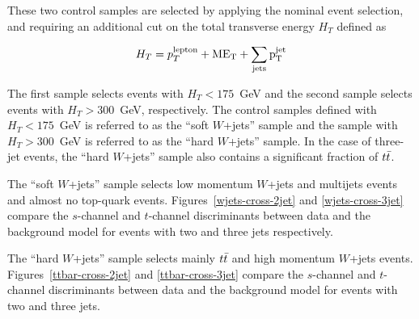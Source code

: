 These two control samples are selected by applying the nominal event
selection, and requiring an additional cut on the total transverse energy $H_{T}$ defined as

\begin{equation}
H_{T} = p^{\rm{lepton}}_{T} + \rm{M}E_{T} + \sum_{\rm{jets}} p^{jet}_{T}
\end{equation}

The first sample selects events with $H_T<175$~GeV and the second sample selects events with $H_T>300$~GeV,
respectively. The control samples defined with $H_{T}<175$~GeV is referred to as the ``soft $W$+jets'' sample and the sample with $H_{T}>300$~GeV is referred to as the ``hard $W$+jets'' sample. In the case of three-jet events, the ``hard $W$+jets'' sample also contains a
significant fraction of $\mbox{$t\bar{t}$}$.

The ``soft $W$+jets'' sample selects low momentum $W$+jets and
multijets events and almost no top-quark events.
Figures~\ref{wjets-cross-2jet} and \ref{wjets-cross-3jet} compare the
$s$-channel and $t$-channel discriminants between data and the background model for
events with two and three jets respectively.

The ``hard $W$+jets'' sample selects mainly $\mbox{$t\bar{t}$}$ and high momentum
$W$+jets events. Figures~\ref{ttbar-cross-2jet} and
\ref{ttbar-cross-3jet} compare the $s$-channel and $t$-channel discriminants between
data and the background model for events with two and three jets.

